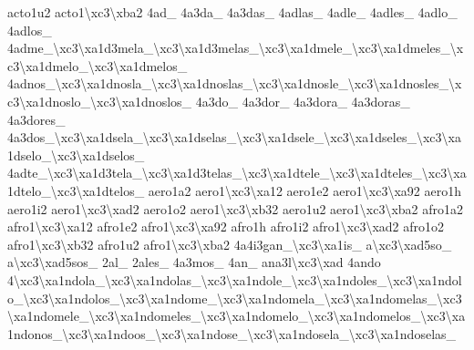 \begin{DoxyCompactItemize}
acto1u2 acto1\textbackslash{}xc3\textbackslash{}xba2 4ad\-\_\- 4a3da\-\_\- 4a3das\-\_\- 4adlas\-\_\- 4adle\-\_\- 4adles\-\_\- 4adlo\-\_\- 4adlos\-\_\- 4adme\-\_\textbackslash{}xc3\textbackslash{}xa1d3mela\-\_\textbackslash{}xc3\textbackslash{}xa1d3melas\-\_\textbackslash{}xc3\textbackslash{}xa1dmele\-\_\textbackslash{}xc3\textbackslash{}xa1dmeles\-\_\textbackslash{}xc3\textbackslash{}xa1dmelo\-\_\textbackslash{}xc3\textbackslash{}xa1dmelos\-\_\- 4adnos\-\_\textbackslash{}xc3\textbackslash{}xa1dnosla\-\_\textbackslash{}xc3\textbackslash{}xa1dnoslas\-\_\textbackslash{}xc3\textbackslash{}xa1dnosle\-\_\textbackslash{}xc3\textbackslash{}xa1dnosles\-\_\textbackslash{}xc3\textbackslash{}xa1dnoslo\-\_\textbackslash{}xc3\textbackslash{}xa1dnoslos\-\_\- 4a3do\-\_\- 4a3dor\-\_\- 4a3dora\-\_\- 4a3doras\-\_\- 4a3dores\-\_\- 4a3dos\-\_\textbackslash{}xc3\textbackslash{}xa1dsela\-\_\textbackslash{}xc3\textbackslash{}xa1dselas\-\_\textbackslash{}xc3\textbackslash{}xa1dsele\-\_\textbackslash{}xc3\textbackslash{}xa1dseles\-\_\textbackslash{}xc3\textbackslash{}xa1dselo\-\_\textbackslash{}xc3\textbackslash{}xa1dselos\-\_\- 4adte\-\_\textbackslash{}xc3\textbackslash{}xa1d3tela\-\_\textbackslash{}xc3\textbackslash{}xa1d3telas\-\_\textbackslash{}xc3\textbackslash{}xa1dtele\-\_\textbackslash{}xc3\textbackslash{}xa1dteles\-\_\textbackslash{}xc3\textbackslash{}xa1dtelo\-\_\textbackslash{}xc3\textbackslash{}xa1dtelos\-\_\- aero1a2 aero1\textbackslash{}xc3\textbackslash{}xa12 aero1e2 aero1\textbackslash{}xc3\textbackslash{}xa92 aero1h aero1i2 aero1\textbackslash{}xc3\textbackslash{}xad2 aero1o2 aero1\textbackslash{}xc3\textbackslash{}xb32 aero1u2 aero1\textbackslash{}xc3\textbackslash{}xba2 afro1a2 afro1\textbackslash{}xc3\textbackslash{}xa12 afro1e2 afro1\textbackslash{}xc3\textbackslash{}xa92 afro1h afro1i2 afro1\textbackslash{}xc3\textbackslash{}xad2 afro1o2 afro1\textbackslash{}xc3\textbackslash{}xb32 afro1u2 afro1\textbackslash{}xc3\textbackslash{}xba2 4a4i3gan\-\_\textbackslash{}xc3\textbackslash{}xa1is\-\_\- a\textbackslash{}xc3\textbackslash{}xad5so\-\_\- a\textbackslash{}xc3\textbackslash{}xad5sos\-\_\- 2al\-\_\- 2ales\-\_\- 4a3mos\-\_\- 4an\-\_\- ana3l\textbackslash{}xc3\textbackslash{}xad 4ando 4\textbackslash{}xc3\textbackslash{}xa1ndola\-\_\textbackslash{}xc3\textbackslash{}xa1ndolas\-\_\textbackslash{}xc3\textbackslash{}xa1ndole\-\_\textbackslash{}xc3\textbackslash{}xa1ndoles\-\_\textbackslash{}xc3\textbackslash{}xa1ndolo\-\_\textbackslash{}xc3\textbackslash{}xa1ndolos\-\_\textbackslash{}xc3\textbackslash{}xa1ndome\-\_\textbackslash{}xc3\textbackslash{}xa1ndomela\-\_\textbackslash{}xc3\textbackslash{}xa1ndomelas\-\_\textbackslash{}xc3\textbackslash{}xa1ndomele\-\_\textbackslash{}xc3\textbackslash{}xa1ndomeles\-\_\textbackslash{}xc3\textbackslash{}xa1ndomelo\-\_\textbackslash{}xc3\textbackslash{}xa1ndomelos\-\_\textbackslash{}xc3\textbackslash{}xa1ndonos\-\_\textbackslash{}xc3\textbackslash{}xa1ndoos\-\_\textbackslash{}xc3\textbackslash{}xa1ndose\-\_\textbackslash{}xc3\textbackslash{}xa1ndosela\-\_\textbackslash{}xc3\textbackslash{}xa1ndoselas\-\_\- 
\end{DoxyCompactItemize}
